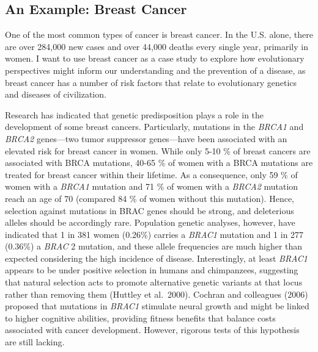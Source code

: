 \documentclass[
]{book}
\begin{document}
\hypertarget{an-example-breast-cancer}{%
\subsection{An Example: Breast Cancer}\label{an-example-breast-cancer}}

One of the most common types of cancer is breast cancer. In the U.S. alone, there are over 284,000 new cases and over 44,000 deaths every single year, primarily in women. I want to use breast cancer as a case study to explore how evolutionary perspectives might inform our understanding and the prevention of a disease, as breast cancer has a number of risk factors that relate to evolutionary genetics and diseases of civilization.

Research has indicated that genetic predisposition plays a role in the development of some breast cancers. Particularly, mutations in the \emph{BRCA1} and \emph{BRCA2} genes---two tumor suppressor genes---have been associated with an elevated risk for breast cancer in women. While only 5-10 \% of breast cancers are associated with BRCA mutations, 40-65 \% of women with a BRCA mutations are treated for breast cancer within their lifetime. As a consequence, only 59 \% of women with a \emph{BRCA1} mutation and 71 \% of women with a \emph{BRCA2} mutation reach an age of 70 (compared 84 \% of women without this mutation). Hence, selection against mutations in BRAC genes should be strong, and deleterious alleles should be accordingly rare. Population genetic analyses, however, have indicated that 1 in 381 women (0.26\%) carries a \emph{BRAC1} mutation and 1 in 277 (0.36\%) a \emph{BRAC} 2 mutation, and these allele frequencies are much higher than expected considering the high incidence of disease. Interestingly, at least \emph{BRAC1} appears to be under positive selection in humans and chimpanzees, suggesting that natural selection acts to promote alternative genetic variants at that locus rather than removing them (Huttley et al.~2000). Cochran and colleagues (2006) proposed that mutations in \emph{BRAC1} stimulate neural growth and might be linked to higher cognitive abilities, providing fitness benefits that balance costs associated with cancer development. However, rigorous tests of this hypothesis are still lacking.
\end{document}
